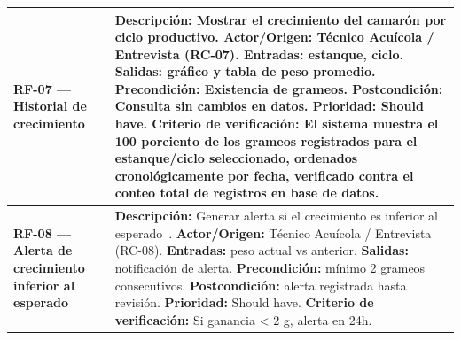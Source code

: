 \documentclass[11pt,a4paper]{article}
\begin{document}
\begin{longtable}{|p{3.5cm}|p{12cm}|}
\textbf{RF-07 — Historial de crecimiento} &
\textbf{Descripción:} Mostrar el crecimiento del camarón por ciclo productivo. \newline
\textbf{Actor/Origen:} Técnico Acuícola / Entrevista (RC-07). \newline
\textbf{Entradas:} estanque, ciclo. \newline
\textbf{Salidas:} gráfico y tabla de peso promedio. \newline
\textbf{Precondición:} Existencia de grameos. \newline
\textbf{Postcondición:} Consulta sin cambios en datos. \newline
\textbf{Prioridad:} Should have. \newline
\textbf{Criterio de verificación:} El sistema muestra el 100 porciento de los grameos registrados para el estanque/ciclo seleccionado, ordenados cronológicamente por fecha, verificado contra el conteo total de registros en base de datos. \\ 
\hline

\textbf{RF-08 — Alerta de crecimiento inferior al esperado} &
\textbf{Descripción:} Generar alerta si el crecimiento es inferior al esperado~\cite{shrimp_monitoring_2021}. \newline
\textbf{Actor/Origen:} Técnico Acuícola / Entrevista (RC-08). \newline
\textbf{Entradas:} peso actual vs anterior. \newline
\textbf{Salidas:} notificación de alerta. \newline
\textbf{Precondición:} mínimo 2 grameos consecutivos. \newline
\textbf{Postcondición:} alerta registrada hasta revisión. \newline
\textbf{Prioridad:} Should have. \newline
\textbf{Criterio de verificación:} Si ganancia < 2 g, alerta en 24h. \\ 
\hline

\end{longtable}
\end{document}
